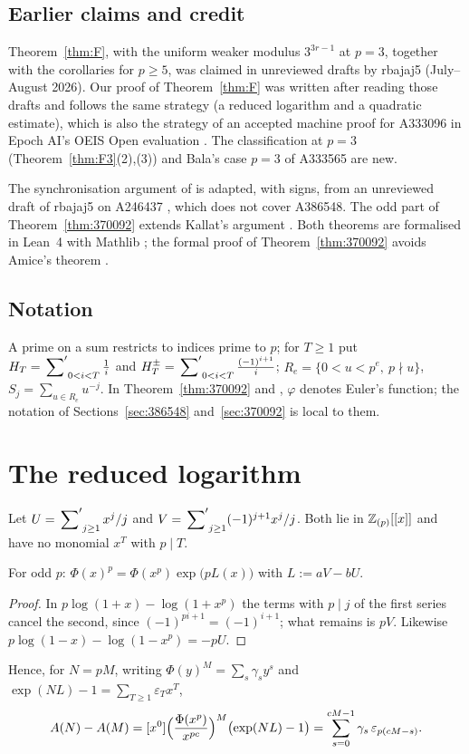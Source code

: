 \documentclass[11pt]{amsart}
\begin{document}
\subsection*{Earlier claims and credit}
Theorem~\ref{thm:F}, with the uniform weaker modulus $3^{3r-1}$ at $p=3$, together with the corollaries for $p\ge5$, was claimed in unreviewed drafts by rbajaj5 \cite{rbajaj5} (July--August 2026). Our proof of Theorem~\ref{thm:F} was written after reading those drafts and follows the same strategy (a reduced logarithm and a quadratic estimate), which is also the strategy of an accepted machine proof for A333096 in Epoch AI's OEIS Open evaluation \cite{adamczewski2026}. The classification at $p=3$ (Theorem~\ref{thm:F3}(2),(3)) and Bala's case $p=3$ of A333565 are new.

The synchronisation argument of  is adapted, with signs, from an unreviewed draft of rbajaj5 on A246437 \cite{rbajaj5}, which does not cover A386548. The odd part of Theorem~\ref{thm:370092} extends Kallat's argument \cite{kallat2026}. Both theorems are formalised in Lean~4 \cite{lean4} with Mathlib \cite{mathlib2020}; the formal proof of Theorem~\ref{thm:370092} avoids Amice's theorem \cite{repo}.

\subsection*{Notation} A prime on a sum restricts to indices prime to $p$; for $T\ge1$ put $H_T=\sideset{}{'}\sum_{0<i<T}\frac1i$ and $H_T^\pm=\sideset{}{'}\sum_{0<i<T}\frac{(-1)^{i+1}}i$; $R_e=\{0<u<p^e,\ p\nmid u\}$, $S_j=\sum_{u\in R_e}u^{-j}$.
In Theorem~\ref{thm:370092} and , $\varphi$ denotes Euler's function; the notation of Sections~\ref{sec:386548} and~\ref{sec:370092} is local to them.

\section{The reduced logarithm}

Let $U=\sideset{}{'}\sum_{j\ge1}x^j/j$ and $V=\sideset{}{'}\sum_{j\ge1}(-1)^{j+1}x^j/j$. Both lie in $\mathbb{Z}_{(p)}[[x]]$ and have no monomial $x^T$ with $p\mid T$.
\begin{lemma}\label{lem:redlog}
For odd $p$: $\Phi(x)^p=\Phi(x^p)\exp\bigl(pL(x)\bigr)$ with $L:=aV-bU$.
\end{lemma}
\begin{proof}
In $p\log(1+x)-\log(1+x^p)$ the terms with $p\mid j$ of the first series cancel the second, since $(-1)^{pi+1}=(-1)^{i+1}$; what remains is $pV$. Likewise $p\log(1-x)-\log(1-x^p)=-pU$.
\end{proof}
Hence, for $N=pM$, writing $\Phi(y)^M=\sum_s\gamma_sy^s$ and $\exp(NL)-1=\sum_{T\ge1}\varepsilon_Tx^T$,
\begin{equation}\label{eq:master}
A(N)-A(M)=[x^0]\Bigl(\frac{\Phi(x^p)}{x^{pc}}\Bigr)^M\bigl(\exp(NL)-1\bigr)=\sum_{s=0}^{cM-1}\gamma_s\,\varepsilon_{p(cM-s)}.
\end{equation}
\end{document}

